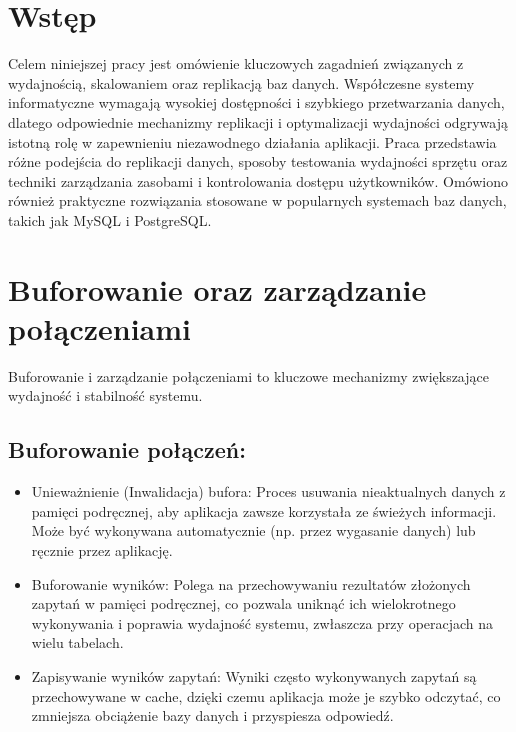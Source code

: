 \documentclass[a4paper,11pt,openany,english]{sphinxmanual}
\begin{document}
\section{Wstęp}
\label{\detokenize{rozdzial2/index:wstep}}
\sphinxAtStartPar
Celem niniejszej pracy jest omówienie kluczowych zagadnień związanych z wydajnością, skalowaniem oraz replikacją baz danych. Współczesne systemy informatyczne wymagają wysokiej dostępności i szybkiego przetwarzania danych, dlatego odpowiednie mechanizmy replikacji i optymalizacji wydajności odgrywają istotną rolę w zapewnieniu niezawodnego działania aplikacji. Praca przedstawia różne podejścia do replikacji danych, sposoby testowania wydajności sprzętu oraz techniki zarządzania zasobami i kontrolowania dostępu użytkowników. Omówiono również praktyczne rozwiązania stosowane w popularnych systemach baz danych, takich jak MySQL i PostgreSQL.


\section{Buforowanie oraz zarządzanie połączeniami}
\label{\detokenize{rozdzial2/index:buforowanie-oraz-zarzadzanie-polaczeniami}}
\sphinxAtStartPar
Buforowanie i zarządzanie połączeniami to kluczowe mechanizmy zwiększające wydajność i stabilność systemu.


\subsection{Buforowanie połączeń:}
\label{\detokenize{rozdzial2/index:buforowanie-polaczen}}\begin{itemize}
\item {} 
\sphinxAtStartPar
Unieważnienie (Inwalidacja) bufora: Proces usuwania nieaktualnych danych z pamięci podręcznej, aby aplikacja zawsze korzystała ze świeżych informacji. Może być wykonywana automatycznie (np. przez wygasanie danych) lub ręcznie przez aplikację.

\item {} 
\sphinxAtStartPar
Buforowanie wyników: Polega na przechowywaniu rezultatów złożonych zapytań w pamięci podręcznej, co pozwala uniknąć ich wielokrotnego wykonywania i poprawia wydajność systemu, zwłaszcza przy operacjach na wielu tabelach.

\item {} 
\sphinxAtStartPar
Zapisywanie wyników zapytań: Wyniki często wykonywanych zapytań są przechowywane w cache, dzięki czemu aplikacja może je szybko odczytać, co zmniejsza obciążenie bazy danych i przyspiesza odpowiedź.

\end{itemize}
\end{document}

